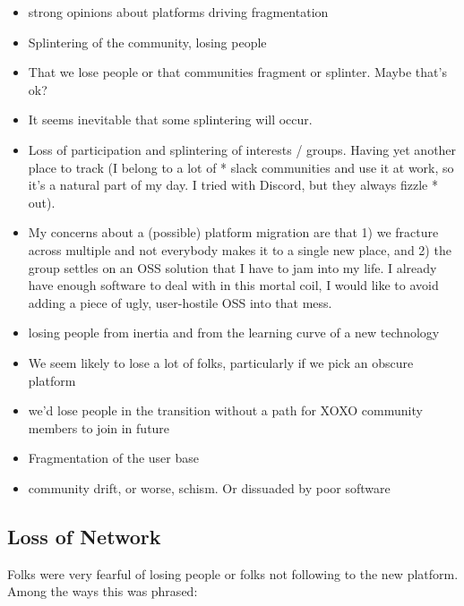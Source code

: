 \documentclass[
]{book}
\providecommand{\tightlist}{%
  \setlength{\itemsep}{0pt}\setlength{\parskip}{0pt}}
\begin{document}
\begin{itemize}
\tightlist
\item
  strong opinions about platforms driving fragmentation
\item
  Splintering of the community, losing people
\item
  That we lose people or that communities fragment or splinter. Maybe that's ok?
\item
  It seems inevitable that some splintering will occur.
\item
  Loss of participation and splintering of interests / groups. Having yet another place to track (I belong to a lot of * slack communities and use it at work, so it's a natural part of my day. I tried with Discord, but they always fizzle * out).
\item
  My concerns about a (possible) platform migration are that 1) we fracture across multiple and not everybody makes it to a single new place, and 2) the group settles on an OSS solution that I have to jam into my life. I already have enough software to deal with in this mortal coil, I would like to avoid adding a piece of ugly, user-hostile OSS into that mess.
\item
  losing people from inertia and from the learning curve of a new technology
\item
  We seem likely to lose a lot of folks, particularly if we pick an obscure platform
\item
  we'd lose people in the transition without a path for XOXO community members to join in future
\item
  Fragmentation of the user base
\item
  community drift, or worse, schism. Or dissuaded by poor software
\end{itemize}

\subsection{Loss of Network}\label{loss-of-network}

Folks were very fearful of losing people or folks not following to the new platform. Among the ways this was phrased:
\end{document}
